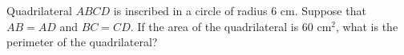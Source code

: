 Quadrilateral $ABCD$ is inscribed in a circle of radius $6$ cm. Suppose that $AB=AD$ and $BC=CD$. If the area of the quadrilateral is $60\text{ cm}^2$, what is the perimeter of the quadrilateral?
